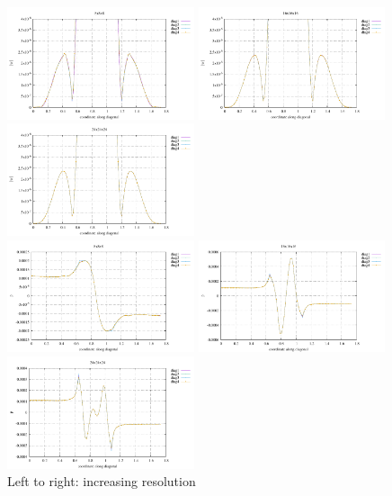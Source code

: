 \begin{center}
\includegraphics[width=5.5cm]{python_codes/fieldstone_82/RESULTS/bench4/w_08}
\includegraphics[width=5.5cm]{python_codes/fieldstone_82/RESULTS/bench4/w_16}
\includegraphics[width=5.5cm]{python_codes/fieldstone_82/RESULTS/bench4/w_24}\\
\includegraphics[width=5.5cm]{python_codes/fieldstone_82/RESULTS/bench4/p_08}
\includegraphics[width=5.5cm]{python_codes/fieldstone_82/RESULTS/bench4/p_16}
\includegraphics[width=5.5cm]{python_codes/fieldstone_82/RESULTS/bench4/p_24}\\
{\captionfont Left to right: increasing resolution}
\end{center}

